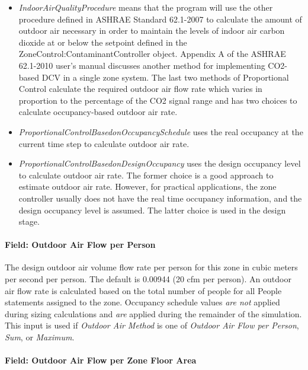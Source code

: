 \begin{itemize}
\item  \emph{IndoorAirQualityProcedure} means that the program will use the other procedure defined in ASHRAE Standard 62.1-2007 to calculate the amount of outdoor air necessary in order to maintain the levels of indoor air carbon dioxide at or below the setpoint defined in the ZoneControl:ContaminantController object. Appendix A of the ASHRAE 62.1-2010 user’s manual discusses another method for implementing CO2-based DCV in a single zone system. The last two methods of Proportional Control calculate the required outdoor air flow rate which varies in proportion to the percentage of the CO2 signal range and has two choices to calculate occupancy-based outdoor air rate. 
  
\item  \emph{ProportionalControlBasedonOccupancySchedule} uses the real occupancy at the current time step to calculate outdoor air rate.

\item  \emph{ProportionalControlBasedonDesignOccupancy} uses the design occupancy level to calculate outdoor air rate. The former choice is a good approach to estimate outdoor air rate. However, for practical applications, the zone controller usually does not have the real time occupancy information, and the design occupancy level is assumed. The latter choice is used in the design stage.

\end{itemize} 


\paragraph{Field: Outdoor Air Flow per Person}\label{field-outdoor-air-flow-per-person}

The design outdoor air volume flow rate per person for this zone in cubic meters per second per person. The default is 0.00944 (20 cfm per person). An outdoor air flow rate is calculated based on the total number of people for all People statements assigned to the zone. Occupancy schedule values \emph{are not} applied during sizing calculations and \emph{are} applied during the remainder of the simulation. This input is used if \emph{Outdoor Air Method} is one of \emph{Outdoor Air Flow per Person}, \emph{Sum}, or \emph{Maximum}.

\paragraph{Field: Outdoor Air Flow per Zone Floor Area}\label{field-outdoor-air-flow-per-zone-floor-area}

